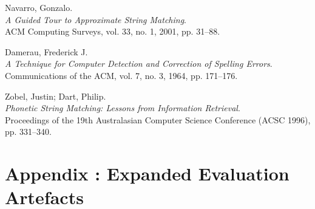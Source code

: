 \documentclass[12pt]{article}
\newif\ifskipsectionclear
\begin{document}
\begin{thebibliography}{9}
Navarro, Gonzalo.\\
\textit{A Guided Tour to Approximate String Matching}.\\
ACM Computing Surveys, vol. 33, no. 1, 2001, pp. 31--88.

Damerau, Frederick J.\\
\textit{A Technique for Computer Detection and Correction of Spelling Errors}.\\
Communications of the ACM, vol. 7, no. 3, 1964, pp. 171--176.

Zobel, Justin; Dart, Philip.\\
\textit{Phonetic String Matching: Lessons from Information Retrieval}.\\
Proceedings of the 19th Australasian Computer Science Conference (ACSC 1996), pp. 331--340.

\end{thebibliography}



\cleardoublepage
\skipsectioncleartrue
{}
\setcounter{page}{1}
\appendix

\section{Appendix \thesection: Expanded Evaluation Artefacts}

\begin{table}[H]
    \centering
    \footnotesize
    \caption{Hold-out test aggregates (20 seeds) for trained detectors. Percentages report mean $\pm$ standard deviation across seeds; counts are means.}
    \label{tab:appendix-holdout-aggregates}
\end{table}
\end{document}
